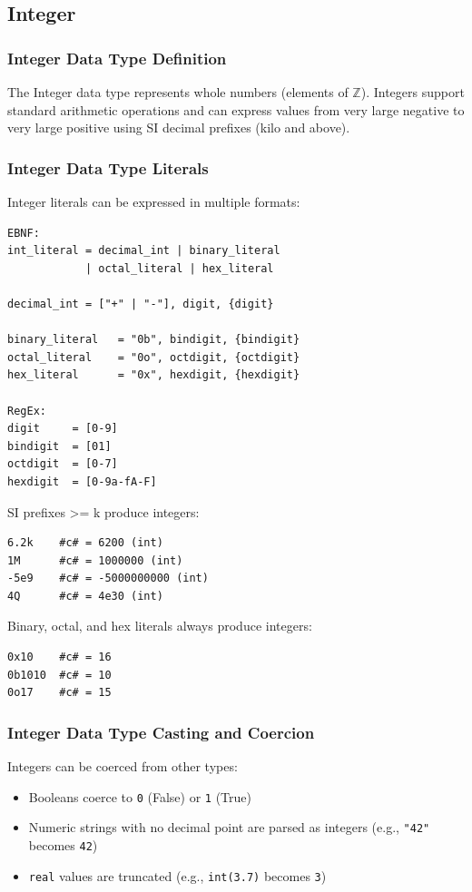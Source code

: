 \documentclass{report}
\begin{document}
\subsection{Integer}
\subsubsection{Integer Data Type Definition}
The Integer data type represents whole numbers (elements of $\mathbb{Z}$). Integers support standard arithmetic operations and can express values from very large negative to very large positive using SI decimal prefixes (kilo and above).
\subsubsection{Integer Data Type Literals}
Integer literals can be expressed in multiple formats:
\begin{verbatim}
EBNF:
int_literal = decimal_int | binary_literal 
            | octal_literal | hex_literal

decimal_int = ["+" | "-"], digit, {digit}

binary_literal   = "0b", bindigit, {bindigit}
octal_literal    = "0o", octdigit, {octdigit}
hex_literal      = "0x", hexdigit, {hexdigit}

RegEx:
digit     = [0-9]
bindigit  = [01]
octdigit  = [0-7]
hexdigit  = [0-9a-fA-F]
\end{verbatim}

SI prefixes >= k produce integers:
\begin{verbatim}
6.2k    #c# = 6200 (int)
1M      #c# = 1000000 (int)
-5e9    #c# = -5000000000 (int)
4Q      #c# = 4e30 (int)
\end{verbatim}

Binary, octal, and hex literals always produce integers:
\begin{verbatim}
0x10    #c# = 16
0b1010  #c# = 10
0o17    #c# = 15
\end{verbatim}

\subsubsection{Integer Data Type Casting and Coercion}
Integers can be coerced from other types:
\begin{itemize}
\item Booleans coerce to \texttt{0} (False) or \texttt{1} (True)
\item Numeric strings with no decimal point are parsed as integers (e.g., \texttt{"42"} becomes \texttt{42})
\item \texttt{real} values are truncated (e.g., \texttt{int(3.7)} becomes \texttt{3})
\end{itemize}
\end{document}
